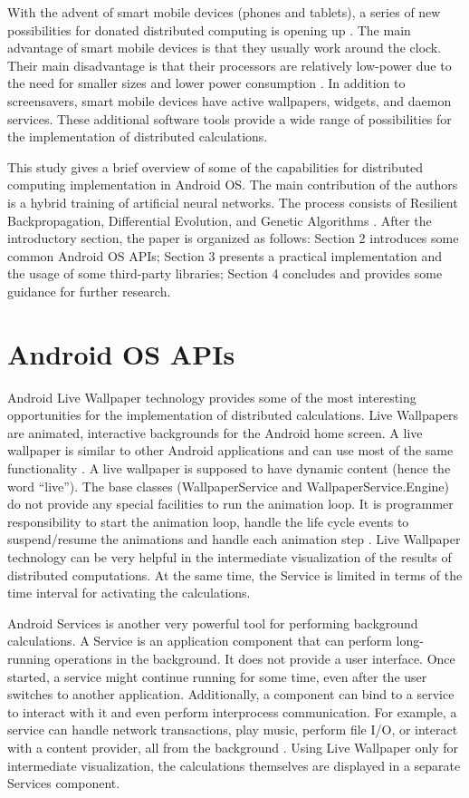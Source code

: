 \documentclass[a4paper,conference]{IEEEtran}
\begin{document}
With the advent of smart mobile devices (phones and tablets), a series of new possibilities for donated distributed computing is opening up \cite{Tapparello-01}. The main advantage of smart mobile devices is that they usually work around the clock. Their main disadvantage is that their processors are relatively low-power due to the need for smaller sizes and lower power consumption \cite{Chinara-01}. In addition to screensavers, smart mobile devices have active wallpapers, widgets, and daemon services. These additional software tools provide a wide range of possibilities for the implementation of distributed calculations. 

This study gives a brief overview of some of the capabilities for distributed computing implementation in Android OS. The main contribution of the authors is a hybrid training of artificial neural networks. The process consists of Resilient Backpropagation, Differential Evolution, and Genetic Algorithms \cite{Balabanov-01}. After the introductory section, the paper is organized as follows: Section 2 introduces some common Android OS APIs; Section 3 presents a practical implementation and the usage of some third-party libraries; Section 4 concludes and provides some guidance for further research. 

\section{Android OS APIs}

Android Live Wallpaper technology provides some of the most interesting opportunities for the implementation of distributed calculations. Live Wallpapers are animated, interactive backgrounds for the Android home screen. A live wallpaper is similar to other Android applications and can use most of the same functionality \cite{Vogel-01}. A live wallpaper is supposed to have dynamic content (hence the word “live”). The base classes (WallpaperService and WallpaperService.Engine) do not provide any special facilities to run the animation loop. It is programmer responsibility to start the animation loop, handle the life cycle events to suspend/resume the animations and handle each animation step \cite{Grouchnikov-01}. Live Wallpaper technology can be very helpful in the intermediate visualization of the results of distributed computations. At the same time, the Service is limited in terms of the time interval for activating the calculations. 

Android Services is another very powerful tool for performing background calculations. A Service is an application component that can perform long-running operations in the background. It does not provide a user interface. Once started, a service might continue running for some time, even after the user switches to another application. Additionally, a component can bind to a service to interact with it and even perform interprocess communication. For example, a service can handle network transactions, play music, perform file I/O, or interact with a content provider, all from the background \cite{Google-01}. Using Live Wallpaper only for intermediate visualization, the calculations themselves are displayed in a separate Services component. 
\end{document}
